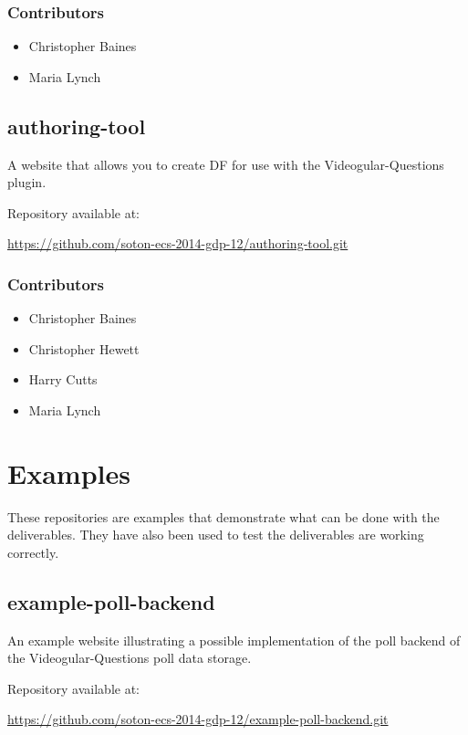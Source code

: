 \subsubsection{Contributors}
\begin{itemize}
  \item Christopher Baines
  \item Maria Lynch
\end{itemize}

\subsection{authoring-tool}
\label{Section:Repo_authoring_tool}

A website that allows you to create \gls{DF} for use with the Videogular-Questions plugin.

Repository available at:

\url{https://github.com/soton-ecs-2014-gdp-12/authoring-tool.git}

\subsubsection{Contributors}
\begin{itemize}
  \item Christopher Baines
  \item Christopher Hewett
  \item Harry Cutts
  \item Maria Lynch
\end{itemize}

\section{Examples}

These repositories are examples that demonstrate what can be done with the deliverables. They have also been used to test the deliverables are working correctly.

\subsection{example-poll-backend}
\label{Section:Repo_example_poll_backend}

An example website illustrating a possible implementation of the poll backend of the Videogular-Questions poll data storage.

Repository available at:

\url{https://github.com/soton-ecs-2014-gdp-12/example-poll-backend.git}


